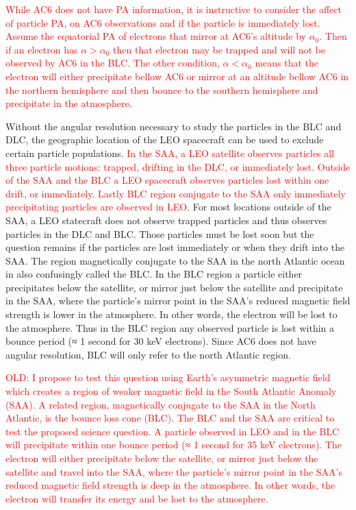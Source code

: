 \documentclass[draft]{agujournal2019}
\begin{document}
\textcolor{red}{While AC6 does not have PA information, it is instructive to consider the affect of particle PA, on AC6 observations and if the particle is immediately lost. Assume the equatorial PA of electrons that mirror at AC6's altitude by $\alpha_0$. Then if an electron has $\alpha > \alpha_0$ then that electron may be trapped and will not be observed by AC6 in the BLC. The other condition, $\alpha < \alpha_0$ means that the electron will either precipitate bellow AC6 or mirror at an altitude bellow AC6 in the northern hemisphere and then bounce to the southern hemisphere and precipitate in the atmosphere.}

Without the angular resolution necessary to study the particles in the BLC and DLC, the geographic location of the LEO spacecraft can be used to exclude certain particle populations. \textcolor{red}{In the SAA, a LEO satellite observes particles all three particle motions: trapped, drifting in the DLC, or immediately lost. Outside of the SAA and the BLC a LEO spacecraft observes particles lost within one drift, or immediately. Lastly BLC region conjugate to the SAA only immediately precipitating particles are observed in LEO.} For most locations outside of the SAA, a LEO statecraft does not observe trapped particles and thus observes particles in the DLC and BLC. Those particles must be lost soon but the question remains if the particles are lost immediately or when they drift into the SAA. The region magnetically conjugate to the SAA in the north Atlantic ocean in also confusingly called the BLC. In the BLC region a particle either precipitates below the satellite, or mirror just below the satellite and precipitate in the SAA, where the particle’s mirror point in the SAA’s reduced magnetic field strength is lower in the atmosphere. In other words, the electron will be lost to the atmosphere. Thus in the BLC region any observed particle is lost within a bounce period (≈ 1 second for 30 keV electrons). Since AC6 does not have angular resolution, BLC will only refer to the north Atlantic region.

\textcolor{red}{OLD: I propose to test this question using Earth’s asymmetric magnetic field which creates a region of weaker magnetic field in the South Atlantic Anomaly (SAA). A related region, magnetically conjugate to the SAA in the North Atlantic, is the bounce loss cone (BLC). The BLC and the SAA are critical to test the proposed science question. A particle observed in LEO and in the BLC will precipitate within one bounce period (≈ 1 second for 35 keV electrons). The electron will either precipitate below the satellite, or mirror just below the satellite and travel into the SAA, where the particle’s mirror point in the SAA’s reduced magnetic field strength is deep in the atmosphere. In other words, the electron will transfer its energy and be lost to the atmosphere.}
\end{document}
